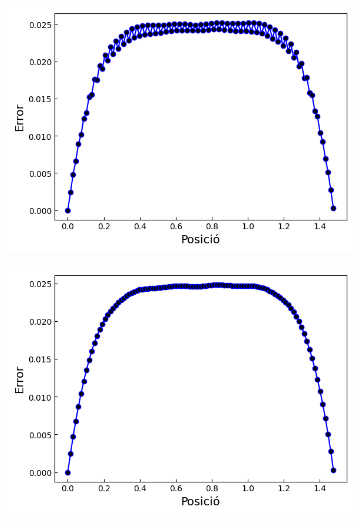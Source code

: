 \documentclass{article}
\begin{document}
\begin{figure}[h]
    \centering
    \begin{subfigure}[b]{0.32\textwidth}
        \includegraphics[width=\textwidth]{images/Error_vs_pos_at1.png} 
        \caption{}
        \label{fig:err_euler_exp_at1}
    \end{subfigure}
    \hfill
    \begin{subfigure}[b]{0.32\textwidth}
        \includegraphics[width=\textwidth]{images/Error_vs_pos_at2.png}
        \caption{} 
        \label{fig:err_euler_exp_at2}
    \end{subfigure}
    \hfill
    \begin{subfigure}[b]{0.32\textwidth}

\end{subfigure}
\end{figure}
\end{document}
